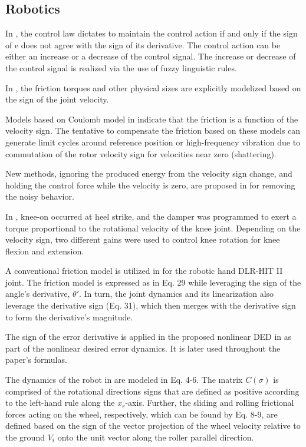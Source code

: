 \documentclass[11pt]{book}
\begin{document}
\subsection{Robotics}

In \cite{tzafestas1999simple}, the control law dictates to maintain
the control action if and only if the sign of e does not agree with
the sign of its derivative. The control action can be either an increase
or a decrease of the control signal. The increase or decrease of the
control signal is realized via the use of fuzzy linguistic rules.

In \cite{pham2001identification}, the friction torques and other
physical sizes are explicitly modelized based on the sign of the joint
velocity.

Models based on Coulomb model in \cite{gervini2003new} indicate that
the friction is a function of the velocity sign. The tentative to
compensate the friction based on these models can generate limit cycles
around reference position or high-frequency vibration due to commutation
of the rotor velocity sign for velocities near zero (shattering).

New methods, ignoring the produced energy from the velocity sign change,
and holding the control force while the velocity is zero, are proposed
in \cite{ryu2005simulation} for removing the noisy behavior.

In \cite{walsh2006autonomous}, knee-on occurred at heel strike, and
the damper was programmed to exert a torque proportional to the rotational
velocity of the knee joint. Depending on the velocity sign, two different
gains were used to control knee rotation for knee flexion and extension.

A conventional friction model is utilized in \cite{chen2014experimental}
for the robotic hand DLR-HIT II joint. The friction model is expressed
as in Eq. 29 while leveraging the sign of the angle's derivative,
$\theta'$. In turn, the joint dynamics and its linearization also
leverage the derivative sign (Eq. 31), which then merges with the
derivative sign to form the derivative's magnitude.

The sign of the error derivative is applied in the proposed nonlinear
DED in \cite{jin2017robust} as part of the nonlinear desired error
dynamics. It is later used throughout the paper's formulas.

The dynamics of the robot in \cite{xie2018power} are modeled in Eq.
4-6. The matrix $C\left(\sigma\right)$ is comprised of the rotational
directions signs that are defined as positive according to the left-hand
rule along the $x_{r}$-axis. Further, the sliding and rolling frictional
forces acting on the wheel, respectively, which can be found by Eq.
8-9, are defined based on the sign of the vector projection of the
wheel velocity relative to the ground $V_{i}$ onto the unit vector
along the roller parallel direction.
\end{document}
